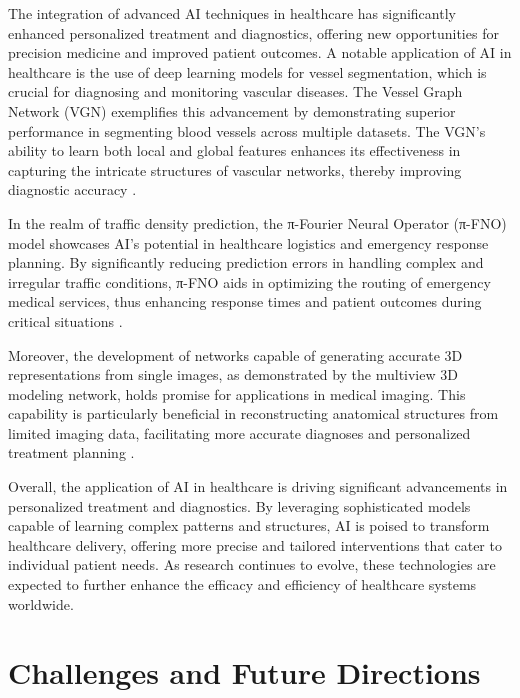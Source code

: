 The integration of advanced AI techniques in healthcare has significantly enhanced personalized treatment and diagnostics, offering new opportunities for precision medicine and improved patient outcomes. A notable application of AI in healthcare is the use of deep learning models for vessel segmentation, which is crucial for diagnosing and monitoring vascular diseases. The Vessel Graph Network (VGN) exemplifies this advancement by demonstrating superior performance in segmenting blood vessels across multiple datasets. The VGN's ability to learn both local and global features enhances its effectiveness in capturing the intricate structures of vascular networks, thereby improving diagnostic accuracy \cite{shin2018deepvesselsegmentationlearning}.



In the realm of traffic density prediction, the π-Fourier Neural Operator (π-FNO) model showcases AI's potential in healthcare logistics and emergency response planning. By significantly reducing prediction errors in handling complex and irregular traffic conditions, π-FNO aids in optimizing the routing of emergency medical services, thus enhancing response times and patient outcomes during critical situations \cite{thodi2023fourierneuraloperatorlearning}.



Moreover, the development of networks capable of generating accurate 3D representations from single images, as demonstrated by the multiview 3D modeling network, holds promise for applications in medical imaging. This capability is particularly beneficial in reconstructing anatomical structures from limited imaging data, facilitating more accurate diagnoses and personalized treatment planning \cite{tatarchenko2016multiview3dmodelssingle}.



Overall, the application of AI in healthcare is driving significant advancements in personalized treatment and diagnostics. By leveraging sophisticated models capable of learning complex patterns and structures, AI is poised to transform healthcare delivery, offering more precise and tailored interventions that cater to individual patient needs. As research continues to evolve, these technologies are expected to further enhance the efficacy and efficiency of healthcare systems worldwide.







\section{Challenges and Future Directions} \label{sec:Challenges and Future Directions}

